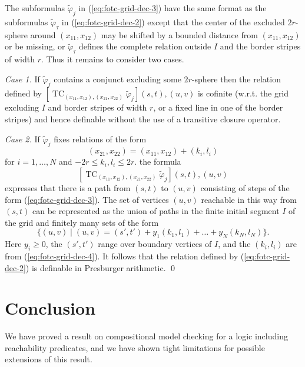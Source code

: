 \documentclass{LMCS}
\renewcommand{\phi}{\varphi}
\DeclareMathOperator{\TC}{TC}
\begin{document}
The subformulas $\tilde\phi_j$ in (\ref{eq:fotc-grid-dec-3}) have the same format as  
the subformulas $\tilde\phi_\tau$ in (\ref{eq:fotc-grid-dec-2}) except that the center of 
the excluded $2r$-sphere around $(x_{11},x_{12})$ may be shifted by a bounded distance 
from $(x_{11},x_{12})$ or be missing, or $\tilde\phi_\tau$ defines the complete relation 
outside $I$ and the border stripes of width $r$.
Thus it remains to consider two cases.

\noindent \emph{Case 1.}  If $\tilde\phi_j$ contains a conjunct 
excluding some $2r$-sphere then the relation defined by $[\TC_{(x_{11},x_{12}),(x_{21},x_{22})} \tilde\phi_j](s,t),(u,v)$ 
is cofinite (w.r.t. the grid excluding $I$ and border stripes of width $r$, or a fixed line in one of the border stripes) 
and hence definable without the use of a transitive closure operator.

\noindent\emph{Case 2.} If  $\tilde\phi_j$ fixes relations of the form
\begin{equation}\label{eq:fotc-grid-dec-4}
 (x_{21},x_{22})=(x_{11},x_{12})+(k_i,l_i) 
\end{equation}
for $i=1,\ldots,N$  and $-2r\le k_i,l_i \le 2r$.
the formula  \[[\TC_{(x_{11},x_{12}),(x_{21},x_{22})} \tilde\phi_j](s,t),(u,v)\] 
expresses that there is a path from $(s,t)$ to $(u,v)$ consisting of steps of the form 
(\ref{eq:fotc-grid-dec-3}). The set of vertices $(u,v)$ reachable in this way from $(s,t)$ 
can be represented as the union of paths in the finite initial segment $I$ of the grid 
and finitely many sets of the form \[\{(u,v)\mid (u,v)=(s',t')+y_1 (k_1,l_1)+ \ldots + y_N (k_N,l_N)\}.\]
Here $y_i \ge 0$, the $(s',t')$ range over boundary vertices of $I$, 
and the $(k_i,l_i)$ are from  (\ref{eq:fotc-grid-dec-4}). It follows that 
the relation defined by (\ref{eq:fotc-grid-dec-2}) is definable in Presburger arithmetic.
\qed






\section{Conclusion}













We have proved a result on compositional model checking for 
a logic including reachability predicates, and we have shown 
tight limitations for possible extensions of this result.
\end{document}
